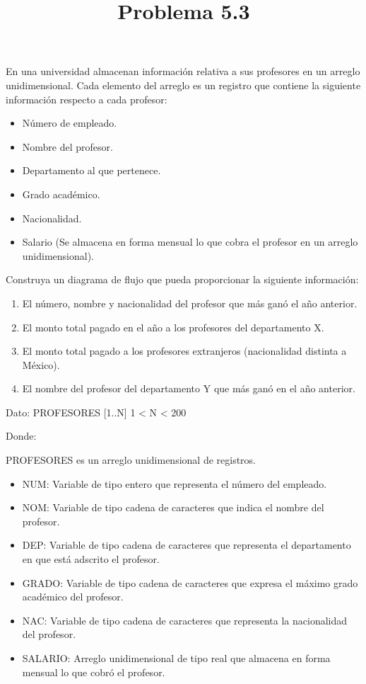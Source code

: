 \documentclass[11pt]{amsart}
\title{Problema 5.3}
\author{}
\begin{document}
\maketitle
En una universidad almacenan información relativa a sus profesores en un arreglo unidimensional. Cada elemento del arreglo es un registro que contiene la siguiente información respecto a cada profesor:

\begin{itemize}
  \item Número de empleado.
  \item Nombre del profesor.
  \item Departamento al que pertenece.
  \item Grado académico.
  \item Nacionalidad.
  \item Salario (Se almacena en forma mensual lo que cobra el profesor en un arreglo unidimensional).
\end{itemize}

Construya un diagrama de flujo que pueda proporcionar la siguiente información:

\begin{enumerate}
  \item El número, nombre y nacionalidad del profesor que más ganó el año anterior.
  \item El monto total pagado en el año a los profesores del departamento X.
  \item El monto total pagado a los profesores extranjeros (nacionalidad distinta a México).
  \item El nombre del profesor del departamento Y que más ganó en el año anterior.
\end{enumerate}

Dato: PROFESORES [1..N] 1 < N < 200

Donde:

PROFESORES es un arreglo unidimensional de registros.


\begin{itemize}
  \item NUM: Variable de tipo entero que representa el número del empleado.
  \item NOM: Variable de tipo cadena de caracteres que indica el nombre del profesor.
  \item DEP: Variable de tipo cadena de caracteres que representa el departamento en que está adscrito el profesor.
  \item GRADO: Variable de tipo cadena de caracteres que expresa el máximo grado académico del profesor.
  \item NAC: Variable de tipo cadena de caracteres que representa la nacionalidad del profesor.
  \item SALARIO: Arreglo unidimensional de tipo real que almacena en forma mensual lo que cobró el profesor.
\end{itemize}
\end{document}
